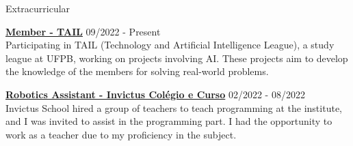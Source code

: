 \documentclass{resume} %
\begin{document}
\begin{rSection}{Extracurricular} \itemsep -1pt {}

    \item \textbf{\href{https://www.instagram.com/tailufpb/}{Member - TAIL}} \hfill 09/2022 - Present \\
    Participating in TAIL (Technology and Artificial Intelligence League), a study league at UFPB, working on projects involving AI. These projects aim to develop the knowledge of the members for solving real-world problems.
    
    \item \textbf{\href{https://www.escolainvictus.com/}{Robotics Assistant - Invictus Colégio e Curso}} \hfill 02/2022 - 08/2022 \\
    Invictus School hired a group of teachers to teach programming at the institute, and I was invited to assist in the programming part. I had the opportunity to work as a teacher due to my proficiency in the subject.
    
\end{rSection}

\end{document}
